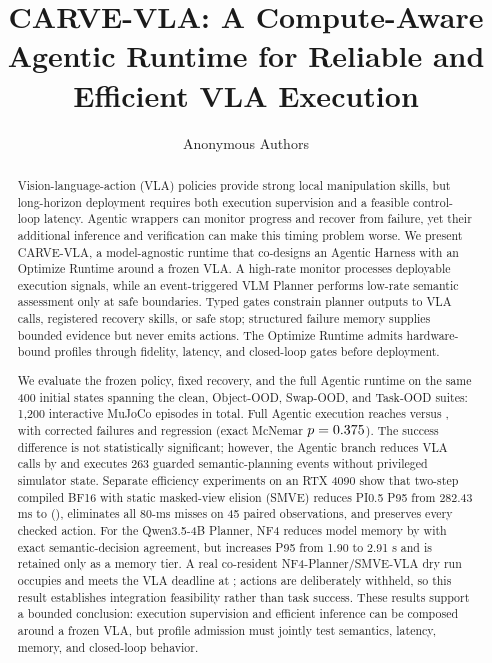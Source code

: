 \documentclass[runningheads]{waica}
\newcommand{\method}{CARVE-VLA}
\begin{document}
\title{CARVE-VLA: A Compute-Aware Agentic Runtime for Reliable and Efficient VLA Execution}

\author{Anonymous Authors}

\maketitle

\begin{abstract}
Vision-language-action (VLA) policies provide strong local manipulation skills,
but long-horizon deployment requires both execution supervision and a feasible
control-loop latency. Agentic wrappers can monitor progress and recover from
failure, yet their additional inference and verification can make this timing
problem worse. We present \method{}, a model-agnostic runtime that co-designs
an Agentic Harness with an Optimize Runtime around a frozen VLA. A high-rate
monitor processes deployable execution signals, while an event-triggered VLM
Planner performs low-rate semantic assessment only at safe boundaries. Typed
gates constrain planner outputs to VLA calls, registered recovery skills, or
safe stop; structured failure memory supplies bounded evidence but never emits
actions. The Optimize Runtime admits hardware-bound profiles through fidelity,
latency, and closed-loop gates before deployment.

We evaluate the frozen policy, fixed recovery, and the full Agentic runtime on
the same 400 initial states spanning the clean, Object-OOD, Swap-OOD, and
Task-OOD suites: 1,200 interactive MuJoCo episodes in total. Full Agentic
execution reaches \CarveFullAgenticSuccess{} versus
\CarveFullFrozenSuccess{}, with \CarveFullConversions{} corrected failures and
\CarveFullRegressions{} regression (exact McNemar $p=0.375$).
The success difference is not statistically significant; however, the
Agentic branch reduces VLA calls by \CarveFullCallReduction{} and executes 263
guarded semantic-planning events without privileged simulator state. Separate
efficiency experiments on an RTX 4090 show that two-step compiled BF16 with
static masked-view elision (SMVE) reduces PI0.5 P95 from 282.43 ms to
\CarveFinalSmvePninetyfive{} (\CarveFinalSmveReduction{}), eliminates all
80-ms misses on 45 paired observations, and preserves every checked action.
For the Qwen3.5-4B Planner, NF4 reduces model memory by
\CarvePlannerNfMemoryReduction{} with exact semantic-decision agreement, but
increases P95 from 1.90 to 2.91 s and is retained only as a memory tier. A real
co-resident NF4-Planner/SMVE-VLA dry run occupies \CarveLowMemoryPair{} and
meets the VLA deadline at \CarveLowMemoryVlaLatency{}; actions are deliberately
withheld, so this result establishes integration feasibility rather than task
success. These results support a bounded conclusion: execution supervision and
efficient inference can be composed around a frozen VLA, but profile admission
must jointly test semantics, latency, memory, and closed-loop behavior.


\end{abstract}
\end{document}
